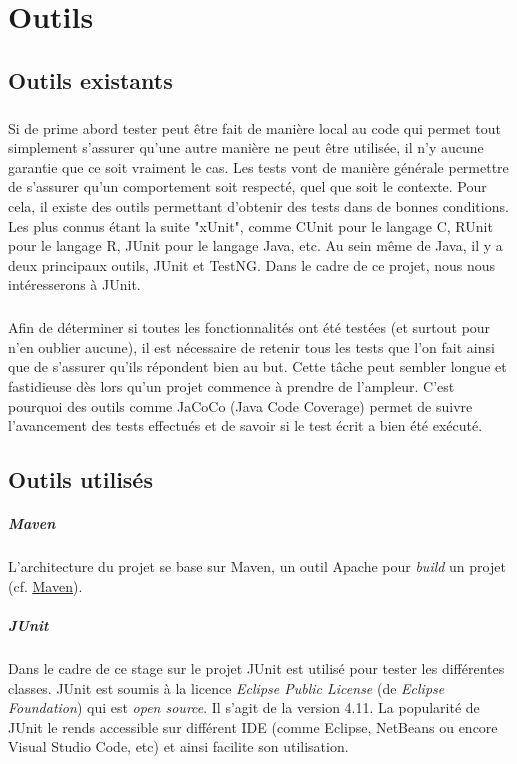 \chapter{Outils}

\section{Outils existants}
\paragraph{}
Si de prime abord tester peut être fait de manière local au code qui permet tout simplement s'assurer qu'une autre manière ne peut être utilisée, il n'y aucune garantie que ce soit vraiment le cas. Les tests vont de manière générale permettre de s'assurer qu'un comportement soit respecté, quel que soit le contexte.
Pour cela, il existe des outils permettant d'obtenir des tests dans de bonnes conditions. Les plus connus étant la suite "xUnit", comme CUnit pour le langage C, RUnit pour le langage R, JUnit pour le langage Java, etc.
Au sein même de Java, il y a deux principaux outils, JUnit et TestNG. Dans le cadre de ce projet, nous nous intéresserons à JUnit.
\paragraph{}
Afin de déterminer si toutes les fonctionnalités ont été testées (et surtout pour n'en oublier aucune), il est nécessaire de retenir tous les tests que l'on fait ainsi que de s'assurer qu'ils répondent bien au but. Cette tâche peut sembler longue et fastidieuse dès lors qu'un projet commence à prendre de l'ampleur. C'est pourquoi des outils comme JaCoCo (Java Code Coverage) permet de suivre l'avancement des tests effectués et de savoir si le test écrit a bien été exécuté.

\section{Outils utilisés}
\paragraph{\textbf{Maven}}
L'architecture du projet se base sur Maven, un outil Apache pour \textit{build} un projet (cf. \hyperref[Maven]{\color{blue}\underline{Maven}}).
\paragraph{JUnit}
Dans le cadre de ce stage sur le projet JUnit est utilisé pour tester les différentes classes. JUnit est soumis à la licence \textit{Eclipse Public License} (de \textit{Eclipse Foundation}) qui est \textit{open source}. Il s'agit de la version 4.11. La popularité de JUnit le rends accessible sur différent IDE (comme Eclipse, NetBeans ou encore Visual Studio Code, etc) et ainsi facilite son utilisation.

